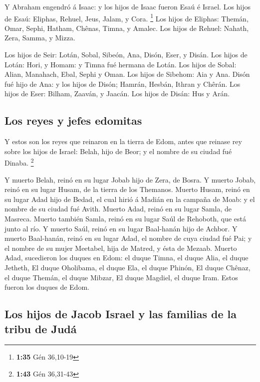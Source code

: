  Y Abraham engendró á Isaac: y los hijos de Isaac fueron
Esaú é Israel.  Los hijos de Esaú: Eliphas, Rehuel, Jeus,
Jalam, y Cora. \footnote{\textbf{1:35} Gén 36,10-19}  Los
hijos de Eliphas: Themán, Omar, Sephi, Hatham, Chênas, Timna, y Amalec.
 Los hijos de Rehuel: Nahath, Zera, Samma, y Mizza.

 Los hijos de Seir: Lotán, Sobal, Sibeón, Ana, Disón, Eser,
y Disán.  Los hijos de Lotán: Hori, y Homam: y Timna fué
hermana de Lotán.  Los hijos de Sobal: Alian, Manahach,
Ebal, Sephi y Oman. Los hijos de Sibehom: Aia y Ana.  Disón
fué hijo de Ana: y los hijos de Disón; Hamrán, Hesbán, Ithran y Chêrán.
 Los hijos de Eser: Bilham, Zaaván, y Jaacán. Los hijos de
Disán: Hus y Arán.

\hypertarget{los-reyes-y-jefes-edomitas}{%
\subsection{Los reyes y jefes
edomitas}\label{los-reyes-y-jefes-edomitas}}

 Y estos son los reyes que reinaron en la tierra de Edom,
antes que reinase rey sobre los hijos de Israel: Belah, hijo de Beor; y
el nombre de su ciudad fué Dinaba. \footnote{\textbf{1:43} Gén 36,31-43}

 Y muerto Belah, reinó en su lugar Jobab hijo de Zera, de
Bosra.  Y muerto Jobab, reinó en su lugar Husam, de la
tierra de los Themanos.  Muerto Husam, reinó en su lugar
Adad hijo de Bedad, el cual hirió á Madián en la campaña de Moab: y el
nombre de su ciudad fué Avith.  Muerto Adad, reinó en su
lugar Samla, de Masreca.  Muerto también Samla, reinó en su
lugar Saúl de Rehoboth, que está junto al río.  Y muerto
Saúl, reinó en su lugar Baal-hanán hijo de Achbor.  Y
muerto Baal-hanán, reinó en su lugar Adad, el nombre de cuya ciudad fué
Pai; y el nombre de su mujer Meetabel, hija de Matred, y ésta de Mezaab.
 Muerto Adad, sucedieron los duques en Edom: el duque
Timna, el duque Alia, el duque Jetheth,  El duque
Oholibama, el duque Ela, el duque Phinón,  El duque Chênaz,
el duque Themán, el duque Mibzar,  El duque Magdiel, el
duque Iram. Estos fueron los duques de Edom.

\hypertarget{los-hijos-de-jacob-israel-y-las-familias-de-la-tribu-de-juduxe1}{%
\subsection{Los hijos de Jacob Israel y las familias de la tribu de
Judá}\label{los-hijos-de-jacob-israel-y-las-familias-de-la-tribu-de-juduxe1}}

